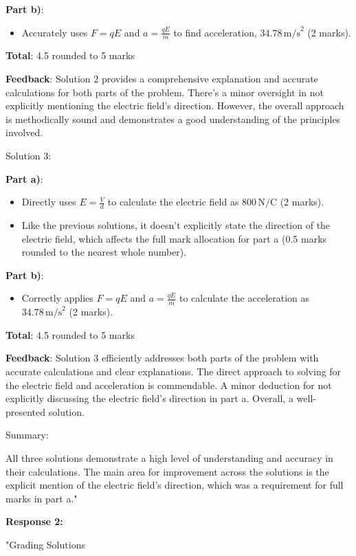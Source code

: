 \documentclass[a4paper,11pt]{article}
\begin{document}
\textbf{Part b)}:
\begin{itemize}
    \item Accurately uses $F = qE$ and $a = \frac{qE}{m}$ to find acceleration, $34.78 \, \text{m/s}^2$ (2 marks).
\end{itemize}

\textbf{Total}: 4.5 rounded to 5 marks

\textbf{Feedback}: Solution 2 provides a comprehensive explanation and accurate calculations for both parts of the problem. There's a minor oversight in not explicitly mentioning the electric field's direction. However, the overall approach is methodically sound and demonstrates a good understanding of the principles involved.

Solution 3:

\textbf{Part a)}:
\begin{itemize}
    \item Directly uses $E = \frac{V}{d}$ to calculate the electric field as $800 \, \text{N/C}$ (2 marks).
    \item Like the previous solutions, it doesn't explicitly state the direction of the electric field, which affects the full mark allocation for part a (0.5 marks rounded to the nearest whole number).
\end{itemize}

\textbf{Part b)}:
\begin{itemize}
    \item Correctly applies $F = qE$ and $a = \frac{qE}{m}$ to calculate the acceleration as $34.78 \, \text{m/s}^2$ (2 marks).
\end{itemize}

\textbf{Total}: 4.5 rounded to 5 marks

\textbf{Feedback}: Solution 3 efficiently addresses both parts of the problem with accurate calculations and clear explanations. The direct approach to solving for the electric field and acceleration is commendable. A minor deduction for not explicitly discussing the electric field's direction in part a. Overall, a well-presented solution.

Summary:

All three solutions demonstrate a high level of understanding and accuracy in their calculations. The main area for improvement across the solutions is the explicit mention of the electric field's direction, which was a requirement for full marks in part a."

\textbf{Response 2:}

"Grading Solutions
\end{document}
